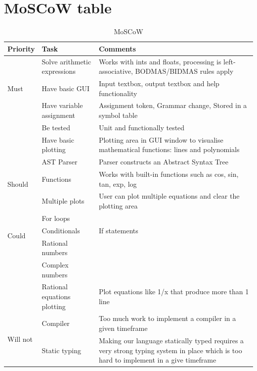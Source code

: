 \documentclass[a4paper, oneside, 11pt]{report}
\begin{document}
\section{MoSCoW table}
\label{appendix:moscow}
\begin{table}[h]
\caption{MoSCoW}
\begin{center}
\begin{tabular}{|p{1in}|p{2in}|p{2.5in}|} \hline
Priority & Task & Comments \\ \hline \hline
\multirow{3}{1in}{Must}
& Solve arithmetic expressions & Works with ints and floats, processing is left-associative, BODMAS/BIDMAS rules apply \\ \cline{2-3}
& Have basic GUI & Input textbox, output textbox and help functionality \\ \cline{2-3}
& Have variable assignment & Assignment token, Grammar change, Stored in a symbol table \\ \cline{2-3}
& Be tested & Unit and functionally tested \\ \cline{2-3}
& Have basic plotting & Plotting area in GUI window to visualise mathematical functions: lines and polynomials \\ \hline \hline
\multirow{3}{1in}{Should}
& AST Parser & Parser constructs an Abstract Syntax Tree \\ \cline{2-3}
& Functions & Works with built-in functions such as cos, sin, tan, exp, log  \\ \cline{2-3}
& Multiple plots & User can plot multiple equations and clear the plotting area \\ \hline \hline
\multirow{3}{1in}{Could}
& For loops & \\ \cline{2-3}
& Conditionals & If statements \\ \cline{2-3}
& Rational numbers & \\ \cline{2-3}
& Complex numbers & \\ \cline{2-3}
& Rational equations plotting & Plot equations like 1/x that produce more than 1 line \\ \hline \hline
\multirow{3}{1in}{Will not}
& Compiler & Too much work to implement a compiler in a given timeframe \\ \cline{2-3}
& Static typing & Making our language statically typed requires a very strong typing system in place which is too hard to implement in a give timeframe \\ \hline
\end{tabular}
\label{Table1}
\end{center}
\end{table}
\end{document}

